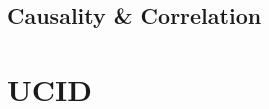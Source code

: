 \subsection{Causality \& Correlation}
\label{subsec:Exploratory-Data-Analysis:Causality-and-Correlation}

\section{UCID}
\label{sec:Exploratory-Data-Analysis:UCID}